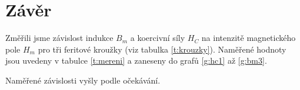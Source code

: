\section*{Závěr}
Změřili jsme závislost indukce $B_m$ a koercivní síly $H_C$ na intenzitě magnetického pole $H_m$ pro tři feritové kroužky (viz tabulka \ref{t:krouzky}).
Naměřené hodnoty jsou uvedeny v tabulce \ref{t:mereni} a zaneseny do grafů \ref{g:hc1} až \ref{g:bm3}.

Naměřené závislosti vyšly podle očekávání.